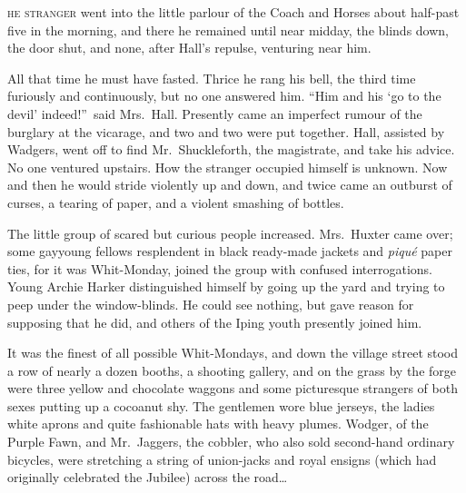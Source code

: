 \label{ch:07}
\begin{ChapterStart}
\vspace*{2\nbs}

\vspace{1.5\nbs}
\vspace{0.75\nbs}
\end{ChapterStart}

\kern-3pt\textsc{he stranger} went into the little parlour of the Coach and Horses about half-past five in the morning, and there he remained until near midday, the blinds down, the door shut, and none, after Hall’s repulse, venturing near him.

All that time he must have fasted. Thrice he rang his bell, the third time furiously and continuously, but no one answered him. “Him and his ‘go to the devil’ indeed!”\ said Mrs.\ Hall. Presently came an imperfect rumour of the burglary at the vicarage, and two and two were put together. Hall, assisted by Wadgers, went off to find Mr.\ Shuckleforth, the magistrate, and take his advice. No one ventured upstairs. How the stranger occupied himself is unknown. Now and then he would stride violently up and down, and twice came an outburst of curses, a tearing of paper, and a violent smashing of bottles.

The little group of scared but curious people increased. Mrs.\ Huxter came over; some gayyoung fellows resplendent in black ready-made jackets and \emph{piqué} paper ties, for it was Whit-Monday, joined the group with confused interrogations. Young Archie Harker distinguished himself by going up the yard and trying to peep under the window-blinds. He could see nothing, but gave reason for supposing that he did, and others of the Iping youth presently joined him.

It was the finest of all possible Whit-Mondays, and down the village street stood a row of nearly a dozen booths, a shooting gallery, and on the grass by the forge were three yellow and chocolate waggons and some picturesque strangers of both sexes putting up a cocoanut shy. The gentlemen wore blue jerseys, the ladies white aprons and quite fashionable hats with heavy plumes. Wodger, of the Purple Fawn, and Mr.\ Jaggers, the cobbler, who also sold second-hand ordinary bicycles, were stretching a string of union-jacks and royal ensigns (which had originally celebrated the Jubilee) across the road…

